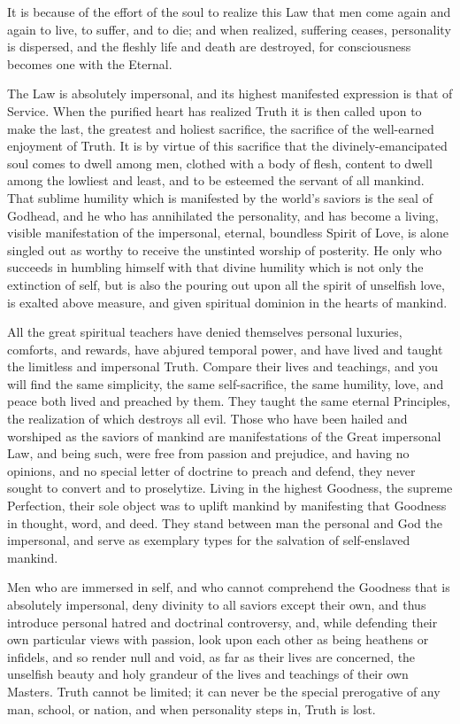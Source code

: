 \documentclass[12pt,oneside]{scrbook}
\begin{document}
  It is because of the effort of the soul to realize this Law that men
  come again and again to live, to suffer, and to die; and when realized,
  suffering ceases, personality is dispersed, and the fleshly life and
  death are destroyed, for consciousness becomes one with the Eternal.
  
  The Law is absolutely impersonal, and its highest manifested expression
  is that of Service. When the purified heart has realized Truth it is
  then called upon to make the last, the greatest and holiest sacrifice,
  the sacrifice of the well-earned enjoyment of Truth. It is by virtue of
  this sacrifice that the divinely-emancipated soul comes to dwell among
  men, clothed with a body of flesh, content to dwell among the lowliest
  and least, and to be esteemed the servant of all mankind. That sublime
  humility which is manifested by the world's saviors is the seal of
  Godhead, and he who has annihilated the personality, and has become a
  living, visible manifestation of the impersonal, eternal, boundless
  Spirit of Love, is alone singled out as worthy to receive the unstinted
  worship of posterity. He only who succeeds in humbling himself with that
  divine humility which is not only the extinction of self, but is also
  the pouring out upon all the spirit of unselfish love, is exalted above
  measure, and given spiritual dominion in the hearts of mankind.
  
  All the great spiritual teachers have denied themselves personal
  luxuries, comforts, and rewards, have abjured temporal power, and have
  lived and taught the limitless and impersonal Truth. Compare their lives
  and teachings, and you will find the same simplicity, the same
  self-sacrifice, the same humility, love, and peace both lived and
  preached by them. They taught the same eternal Principles, the
  realization of which destroys all evil. Those who have been hailed and
  worshiped as the saviors of mankind are manifestations of the Great
  impersonal Law, and being such, were free from passion and prejudice,
  and having no opinions, and no special letter of doctrine to preach and
  defend, they never sought to convert and to proselytize. Living in the
  highest Goodness, the supreme Perfection, their sole object was to
  uplift mankind by manifesting that Goodness in thought, word, and deed.
  They stand between man the personal and God the impersonal, and serve as
  exemplary types for the salvation of self-enslaved mankind.
  
  Men who are immersed in self, and who cannot comprehend the Goodness
  that is absolutely impersonal, deny divinity to all saviors except their
  own, and thus introduce personal hatred and doctrinal controversy, and,
  while defending their own particular views with passion, look upon each
  other as being heathens or infidels, and so render null and void, as far
  as their lives are concerned, the unselfish beauty and holy grandeur of
  the lives and teachings of their own Masters. Truth cannot be limited;
  it can never be the special prerogative of any man, school, or nation,
  and when personality steps in, Truth is lost.
  
\end{document}
